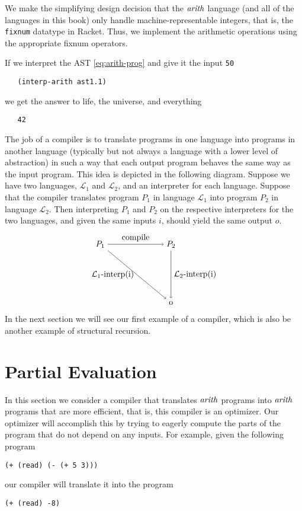 \documentclass[12pt]{book}
\begin{document}
We make the simplifying design decision that the $\mathit{arith}$
language (and all of the languages in this book) only handle
machine-representable integers, that is, the \texttt{fixnum} datatype
in Racket. Thus, we implement the arithmetic operations using the
appropriate fixnum operators.

If we interpret the AST \eqref{eq:arith-prog} and give it the input
\texttt{50}
\begin{lstlisting}
   (interp-arith ast1.1)
\end{lstlisting}
we get the answer to life, the universe, and everything
\begin{lstlisting}
   42
\end{lstlisting}

The job of a compiler is to translate programs in one language into
programs in another language (typically but not always a language with
a lower level of abstraction) in such a way that each output program
behaves the same way as the input program. This idea is depicted in
the following diagram. Suppose we have two languages, $\mathcal{L}_1$
and $\mathcal{L}_2$, and an interpreter for each language.  Suppose
that the compiler translates program $P_1$ in language $\mathcal{L}_1$
into program $P_2$ in language $\mathcal{L}_2$.  Then interpreting
$P_1$ and $P_2$ on the respective interpreters for the two languages,
and given the same inputs $i$, should yield the same output $o$.
\begin{equation} \label{eq:compile-correct}
\begin{tikzpicture}[baseline=(current  bounding  box.center)]
 \node (p1) at (0,  0) {$P_1$};
 \node (p2) at (3,  0) {$P_2$};
 \node (o)  at (3, -2.5) {o};

 \path[->] (p1) edge [above] node {compile} (p2);
 \path[->] (p2) edge [right] node {$\mathcal{L}_2$-interp(i)} (o);
 \path[->] (p1) edge [left]  node {$\mathcal{L}_1$-interp(i)} (o);
\end{tikzpicture}
\end{equation}
In the next section we will see our first example of a compiler, which
is also be another example of structural recursion.


\section{Partial Evaluation}
\label{sec:partial-evaluation}

In this section we consider a compiler that translates $\mathit{arith}$
programs into $\mathit{arith}$ programs that are more efficient, that is,
this compiler is an optimizer. Our optimizer will accomplish this by
trying to eagerly compute the parts of the program that do not depend
on any inputs. For example, given the following program
\begin{lstlisting}
(+ (read) (- (+ 5 3)))
\end{lstlisting}
our compiler will translate it into the program
\begin{lstlisting}
(+ (read) -8)
\end{lstlisting}
\end{document}
